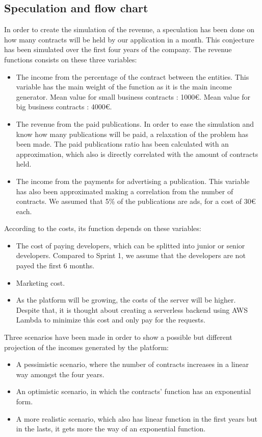 \documentclass[./main.tex]{subfiles}
\begin{document}
\subsection{Speculation and flow chart}
In order to create the simulation of the revenue, a speculation has been done on how many contracts will be held by our application in a month. This conjecture has been simulated over the first four years of the company. The revenue functions consists on these three variables:
\begin{itemize}
	\item The income from the percentage of the contract between the entities. This variable has the main weight of the function as it is the main income generator. Mean value for small business contracts : 1000€. Mean value for big business contracts : 4000€. 
	\item The revenue from the paid publications. In order to ease the simulation and know how many publications will be paid, a relaxation of the problem has been made. The paid publications ratio has been calculated with an approximation, which also is directly correlated with the amount of contracts held.
	\item The income from the payments for advertising a publication. This variable has also been approximated making a correlation from the number of contracts. We assumed that 5\% of the publications are ads, for a cost of 30€ each.
\end{itemize}
According to the costs, its function depends on these variables:
\begin{itemize}
	\item The cost of paying developers, which can be splitted into junior or senior developers. Compared to Sprint 1, we assume that the developers are not payed the first 6 months.
	\item Marketing cost. 
	\item As the platform will be growing, the costs of the server will be higher. Despite that, it is thought about creating a serverless backend using AWS Lambda to minimize this cost and only pay for the requests.
\end{itemize}
Three scenarios have been made in order to show a possible but different projection of the incomes generated by the platform:
\begin{itemize}
	\item A pessimistic scenario, where the number of contracts increases in a linear way amongst the four years.
	\item An optimistic scenario, in which the contracts’ function has an exponential form.
	\item A more realistic scenario, which also has linear function in the first years but in the lasts, it gets more the way of an exponential function.
\end{itemize}
\end{document}
